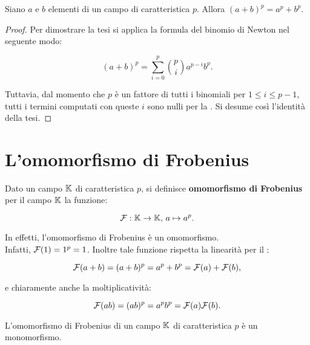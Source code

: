 \begin{theorem}
    \label{th:binomio_ingenuo}
    Siano $a$ e $b$ elementi di un campo di caratteristica $p$. Allora
    $(a+b)^p = a^p + b^p$.
\end{theorem}

\begin{proof}
    Per dimostrare la tesi si applica la formula del binomio di Newton
    nel seguente modo:

    \[ (a+b)^p = \sum_{i=0}^p \binom{p}{i} a^{p-i}b^p. \]

    \vskip 0.1in

    Tuttavia, dal momento che $p$ è un fattore di tutti i binomiali per
    $1 \leq i \leq p-1$, tutti i termini computati con queste $i$
    sono nulli per la .
    Si desume così l'identità della tesi.
\end{proof}

\section{L'omomorfismo di Frobenius}

\begin{definition}
    Dato un campo $\mathbb{K}$ di caratteristica $p$, si definisce
    \textbf{omomorfismo di Frobenius} per il campo $\mathbb{K}$
    la funzione:

    \[ \mathcal{F} : \mathbb{K} \to \mathbb{K},\, a \mapsto a^p. \]
\end{definition}

\begin{remark*}
    In effetti, l'omomorfismo di Frobenius è un omomorfismo. \\

    Infatti, $\mathcal{F}(1) = 1^p = 1$. Inoltre tale funzione
    rispetta la linearità per il :

    \[ \mathcal{F}(a + b) = (a+b)^p = a^p + b^p = \mathcal{F}(a) + \mathcal{F}(b), \]

    \vskip 0.1in

    e chiaramente anche la moltiplicatività:

    \[ \mathcal{F}(ab) = (ab)^p = a^p b^p = \mathcal{F}(a) \mathcal{F}(b). \]
\end{remark*}

\begin{proposition}
    \label{prop:frobenius_monomorfismo}
    L'omomorfismo di Frobenius di un campo $\mathbb{K}$ di caratteristica
    $p$ è un monomorfismo.
\end{proposition}

